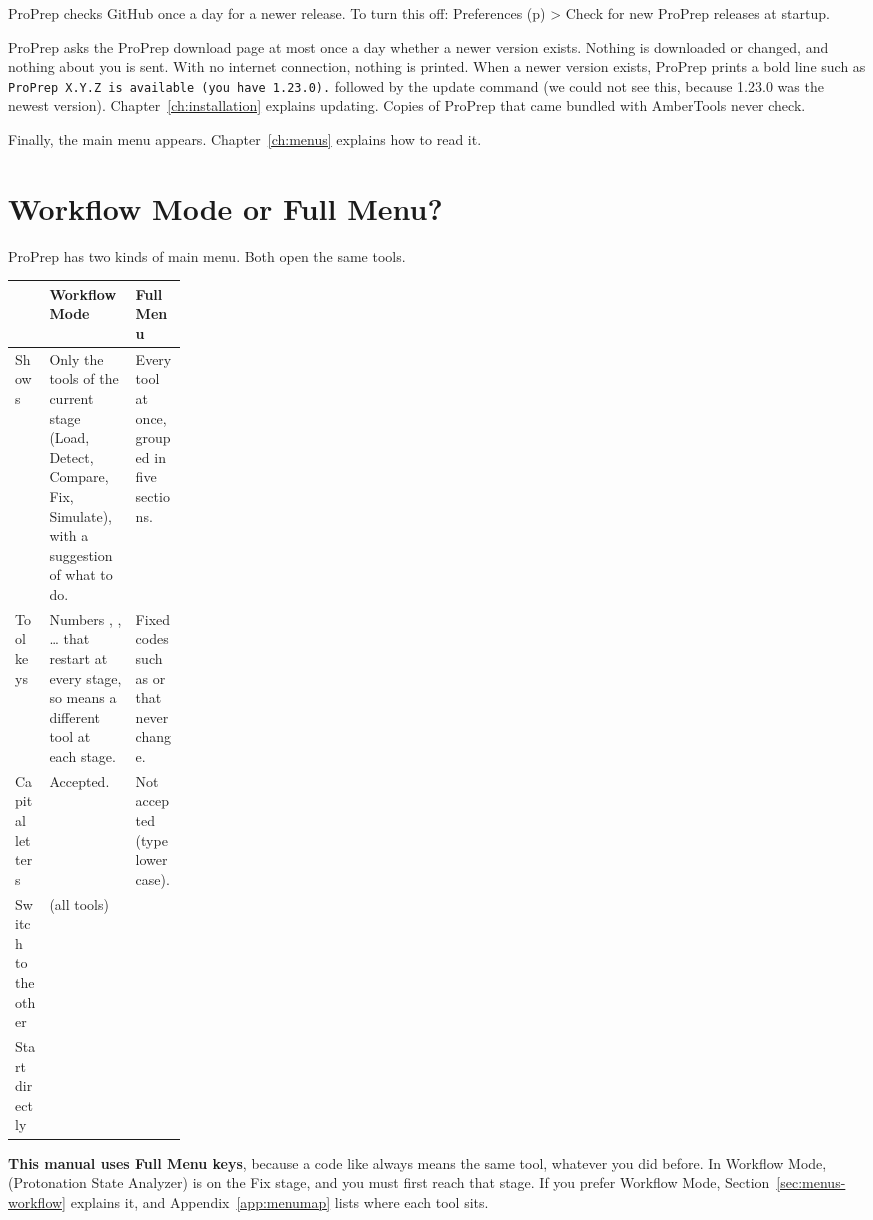 \begin{screen}
ProPrep checks GitHub once a day for a newer release. To turn this off:
Preferences (p) > Check for new ProPrep releases at startup.
\end{screen}

ProPrep asks the ProPrep download page at most once a day whether a newer
version exists. Nothing is downloaded or changed, and nothing about you is sent.
With no internet connection, nothing is printed. When a newer version exists,
ProPrep prints a bold line such as
\texttt{ProPrep X.Y.Z is available (you have 1.23.0).} followed by the update
command (we could not see this, because 1.23.0 was the newest version).
Chapter~\ref{ch:installation} explains updating. Copies of ProPrep that came
bundled with AmberTools never check.

Finally, the main menu appears. Chapter~\ref{ch:menus} explains how to read it.

\section{Workflow Mode or Full Menu?}\label{sec:starting-modes}

ProPrep has two kinds of main menu. Both open the same tools.

\begin{tabularx}{\linewidth}{@{}p{0.2\linewidth}LL@{}}
\toprule
 & \textbf{Workflow Mode} & \textbf{Full Menu} \\
\midrule
Shows & Only the tools of the current stage (Load, Detect, Compare, Fix,
Simulate), with a suggestion of what to do. & Every tool at once, grouped in
five sections. \\
Tool keys & Numbers , , \ldots{} that restart at every stage,
so  means a different tool at each stage. & Fixed codes such as
 or  that never change. \\
Capital letters & Accepted. & Not accepted (type lowercase). \\
Switch to the other &  (all tools) &  \\
Start directly &  &  \\
\bottomrule
\end{tabularx}

\medskip
\textbf{This manual uses Full Menu keys}, because a code like  always
means the same tool, whatever you did before. In Workflow Mode, 
(Protonation State Analyzer) is  on the Fix stage, and you must first
reach that stage. If you prefer Workflow Mode, Section~\ref{sec:menus-workflow}
explains it, and Appendix~\ref{app:menumap} lists where each tool sits.

